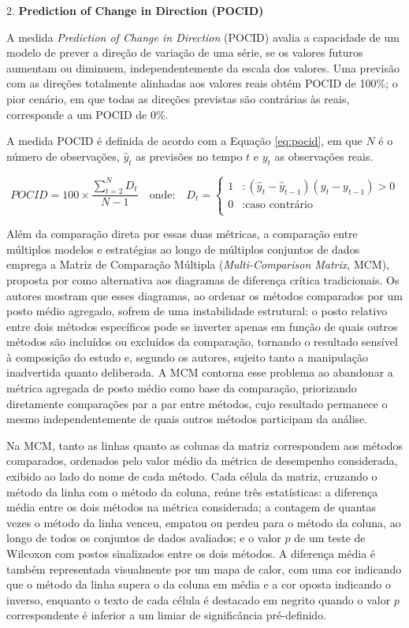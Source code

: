 2. \textbf{Prediction of Change in Direction (POCID)}

A medida \textit{Prediction of Change in Direction} (POCID) avalia a capacidade de um modelo de prever a direção de variação de uma série, se os valores futuros aumentam ou diminuem, independentemente da escala dos valores. Uma previsão com as direções totalmente alinhadas aos valores reais obtém POCID de 100\%; o pior cenário, em que todas as direções previstas são contrárias às reais, corresponde a um POCID de 0\%.

A medida POCID é definida de acordo com a Equação \ref{eq:pocid}, em que $N$ é o número de observações, \(\hat{y}_t\) as previsões no tempo $t$ e \(y_t\) as observações reais.

\begin{equation}
POCID = 100 \times \frac{\sum_{t=2}^N D_t}{N-1} \quad \text{onde:} \quad D_t =
\left\{
\begin{aligned}
1 & : (\hat{y}_t - \hat{y}_{t-1})(y_t - y_{t-1}) > 0\\
0 & : \text{caso contrário} \\
\end{aligned}
\right.
\label{eq:pocid}
\end{equation}

Além da comparação direta por essas duas métricas, a comparação entre múltiplos modelos e estratégias ao longo de múltiplos conjuntos de dados emprega a Matriz de Comparação Múltipla (\textit{Multi-Comparison Matrix}, MCM), proposta por \citet{ismail2023mcm} como alternativa aos diagramas de diferença crítica tradicionais.  Os autores mostram que esses diagramas, ao ordenar os métodos comparados por um posto médio agregado, sofrem de uma instabilidade estrutural: o posto relativo entre dois métodos específicos pode se inverter apenas em função de quais outros métodos são incluídos ou excluídos da comparação, tornando o resultado sensível à composição do estudo e, segundo os autores, sujeito tanto a manipulação inadvertida quanto deliberada. A MCM contorna esse problema ao abandonar a métrica agregada de posto médio como base da comparação, priorizando diretamente comparações par a par entre métodos, cujo resultado permanece o mesmo independentemente de quais outros métodos participam da análise.

Na MCM, tanto as linhas quanto as colunas da matriz correspondem aos métodos comparados, ordenados pelo valor médio da métrica de desempenho considerada, exibido ao lado do nome de cada método. Cada célula da matriz, cruzando o método da linha com o método da coluna, reúne três estatísticas: a diferença média entre os dois métodos na métrica considerada; a contagem de quantas vezes o método da linha venceu, empatou ou perdeu para o método da coluna, ao longo de todos os conjuntos de dados avaliados; e o valor $p$ de um teste de Wilcoxon com postos sinalizados entre os dois métodos. A diferença média é também representada visualmente por um mapa de calor, com uma cor indicando que o método da linha supera o da coluna em média e a cor oposta indicando o inverso, enquanto o texto de cada célula é destacado em negrito quando o valor $p$ correspondente é inferior a um limiar de significância pré-definido. 



